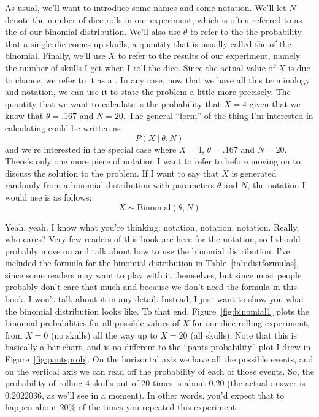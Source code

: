As usual, we'll want to introduce some names and some notation. We'll let $N$ denote the number of dice rolls in our experiment; which is often referred to as the  of our binomial distribution. We'll also use $\theta$ to refer to the the probability that a single die comes up skulls, a quantity that is usually called the  of the binomial. Finally, we'll use $X$ to refer to the results of our experiment, namely the number of skulls I get when I roll the dice. Since the actual value of $X$ is due to chance, we refer to it as a . In any case, now that we have all this terminology and notation, we can use it to state the problem a little more precisely. The quantity that we want to calculate is the probability that $X = 4$ given that we know that $\theta = .167$ and $N=20$. The general ``form'' of the thing I'm interested in calculating could be written as 
$$
P(X \ | \ \theta, N)
$$
and we're interested in the special case where $X=4$, $\theta = .167$ and $N=20$. 
There's only one more piece of notation I want to refer to before moving on to discuss the solution to the problem. If I want to say that $X$ is generated randomly from a binomial distribution with parameters $\theta$ and $N$, the notation I would use is as follows:
$$
X \sim \mbox{Binomial}(\theta, N)
$$ 

Yeah, yeah. I know what you're thinking: notation, notation, notation. Really, who cares? Very few readers of this book are here for the notation, so I should probably move on and talk about how to use the binomial distribution. I've included the formula for the binomial distribution in Table~\ref{tab:distformulas}, since some readers may want to play with it themselves, but since most people probably don't care that much and because we don't need the formula in this book, I won't talk about it in any detail. Instead, I just want to show you what the binomial distribution looks like. To that end, Figure~\ref{fig:binomial1} plots the binomial probabilities for all possible values of $X$ for our dice rolling experiment, from $X=0$ (no skulls) all the way up to $X=20$ (all skulls). Note that this is basically a bar chart, and is no different to the ``pants probability'' plot I drew in Figure~\ref{fig:pantsprob}. On the horizontal axis we have all the possible events, and on the vertical axis we can read off the probability of each of those events. So, the probability of rolling 4 skulls out of 20 times is about 0.20 (the actual answer is 0.2022036, as we'll see in a moment). In other words, you'd expect that to happen about 20\% of the times you repeated this experiment.


